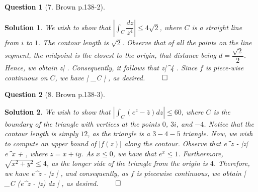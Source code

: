 \documentclass{article} %
\def\eQb#1\eQe{\begin{eqnarray*}#1\end{eqnarray*}}
\theoremstyle{quest}
\newtheorem*{question}{Question}
\newtheorem*{solution}{Solution}
\begin{document}
\bigskip

\begin{question}[7. Brown p.138-2]
\end{question}
\begin{solution}
We wish to show that $\left| \int_{C}  \dfrac{dz}{z^4} \right| \leq 4\sqrt{2}$, where
$C$ is a straight line from $i$ to $1$. The contour length is $\sqrt{2}$.
Observe that of all the points on the line segment, the midpoint is the closest to the origin,
that distance being $d = \dfrac{\sqrt{2}}{2}$. Hence, we obtain
\eQb
|z| \geq {}.
\eQe
Consequently, it follows that 
\eQb
|z|^4 \geq {}   .
\eQe
Since $f$ is piece-wise continuous on $C$, we have 
\eQb
\left| \int_{C}  \right| , 
\eQe
as desired. $\qed$
\end{solution}

\bigskip

\begin{question}[8. Brown p.138-3]
\end{question}
\begin{solution}
We wish to show that $\left| \int_{C} (e^z - \bar{z}) dz \right| \leq 60$, where $C$ is the
boundary of the triangle with vertices at the points $0$, $3i$, and $-4$. Notice that
the contour length is simply $12$, as the triangle is a $3-4-5$ triangle. Now, we wish to 
compute an upper bound of $|f(z)|$ along the contour. Observe that
\eQb
|e^z - \bar{z}| \leq e^x + , 
\eQe  
where $z = x + iy$. As $x \leq 0$, we have that $e^x \leq 1$. Furthermore, 
$\sqrt{x^2 + y^2} \leq 4$, as the longer side of the triangle from the origin is $4$. Therefore,
we have 
\eQb
|e^z - \bar{z} | ,
\eQe 
and consequently, as $f$ is piecewise continuous, we obtain
\eQb
\left| \int_{C} (e^z - \bar{z}) dz \right| ,
\eQe
as desired. $\qed$
\end{solution}

\bigskip
\end{document}
